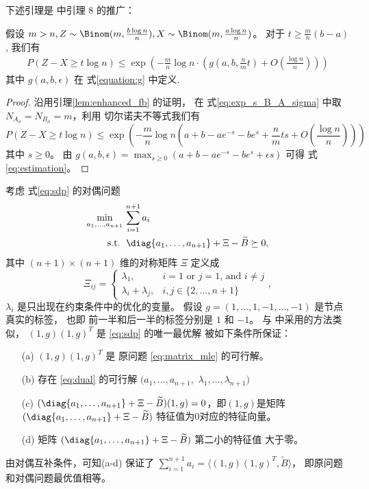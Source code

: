 下述引理是
\citet{abbe2015exact}
中引理 8 的推广：
\begin{lemma}\label{lem:zxt}
    假设 $m > n, Z \sim \Binom(m, \frac{b\log n}{n}), X\sim \Binom(m, \frac{a\log n}{n})$。
    对于 $ t \geq \frac{m}{n}(b - a)$, 我们有
    \begin{align}\label{eq:estimation}
        P(Z - X \geq t \log n) \leq \exp(-\frac{m}{n}\log n \cdot ( g(a, b, \frac{n}{m}t) + O(\frac{\log n}{n})))
    \end{align}
    其中 $g(a,b,\epsilon)$ 在 式\eqref{equation:g} 中定义.
\end{lemma}
\begin{proof}
    沿用引理\ref{lem:enhanced_fb} 的证明，
在 式\eqref{eq:exp_s_B_A_sigma}
中取  $N_{A_{\bar{\sigma}}}
=N_{B_{\bar{\sigma}}}=m$，利用
切尔诺夫不等式我们有
\begin{equation*}
    P(Z - X \geq t \log n) \leq \exp(-\frac{m}{n}\log n (a+b-ae^{-s}-be^s+\frac{n}{m}ts + O(\frac{\log n}{n})))
\end{equation*}
其中 $s \geq 0$。
由 $g(a,b,\epsilon) = 
\max_{s \geq 0} (a+b-a e^{-s} - b e^s + \epsilon s)$
可得 式 \eqref{eq:estimation}。
\end{proof}
考虑 式\eqref{eq:sdp} 的对偶问题
\begin{align}
    \min_{a_1, \dots, a_{n+1}}\, &\sum_{i=1}^{n+1} a_i \nonumber\\
    \label{eq:dual}
    \textrm{s.t. } &\, \diag\{a_1, \dots, a_{n+1}\} + \Xi - \widetilde{B} \succeq 0, 
\end{align}
其中 $(n+1)\times (n+1)$ 维的对称矩阵
$\Xi$ 定义成 
\begin{equation}
    \Xi_{ij} = \begin{cases}
        \lambda_1, & i=1\text{ or }j=1 \text{, and }i\ne j\\
        \lambda_i + \lambda_j, & i, j\in\{2,\ldots,n+1\}
    \end{cases},
\end{equation}
$\lambda_i$ 是只出现在约束条件中的优化的变量。
假设 $g=(1,\ldots,1,-1,\ldots,-1)$ 是节点真实的标签，
也即
前一半和后一半的标签分别是  $1$ 和 $-1$。
与 \citet{abbe2015exact} 中采用的方法类似，
$(1,g)(1,g)^T$ 是 \eqref{eq:sdp} 的唯一最优解
 被如下条件所保证：
\begin{enumerate}
    \item[(a)] $(1,g)(1,g)^T$ 是 原问题 \eqref{eq:matrix_mle} 的可行解。
    \item[(b)] 存在 \eqref{eq:dual} 的可行解 $(a_1,\ldots,a_{n+1},$ $\lambda_1,\ldots,\lambda_{n+1})$ 
    \item[(c)] $(\diag\{a_1, \dots, a_{n+1}\} + \Xi - \widetilde{B})(1,g)=0$，即$(1,g)$是矩阵 $(\diag\{a_1, \dots, a_{n+1}\} + \Xi - \widetilde{B})$ 特征值为0对应的特征向量。
    \item[(d)]  矩阵 $(\diag\{a_1, \dots, a_{n+1}\} + \Xi - \widetilde{B})$ 第二小的特征值 大于零。 
\end{enumerate}
由对偶互补条件，可知(a-d) 保证了 
$\sum_{i=1}^{n+1} a_i=\langle(1,g)(1,g)^T,\widetilde{B} \rangle$，
即原问题和对偶问题最优值相等。

